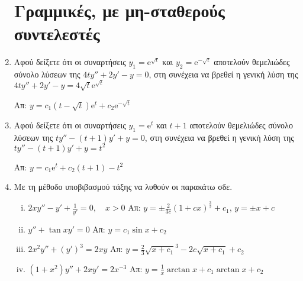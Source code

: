 \begin{enumerate}
  \section*{Γραμμικές, με μη-σταθερούς συντελεστές}

\item Αφού δείξετε ότι οι συναρτήσεις $ y_{1} = \mathrm{e}^{\sqrt{t}} $ και $ y_{2}= 
  \mathrm{e}^{- \sqrt{t}}$ αποτελούν θεμελιώδες σύνολο λύσεων της $ 4ty'' +2y'-y=0 $, 
  στη συνέχεια να βρεθεί η γενική λύση της 
  $ 4ty''+2y'-y=4 \sqrt{t} \mathrm{e}^{\sqrt{t}} $

  \hfill Απ: $ y= c_{1}(t- \sqrt{t}) \mathrm{e}^{t} + c_{2} \mathrm{e}^{- \sqrt{t}} $ 

\item Αφού δείξετε ότι οι συναρτήσεις $ y_{1} = \mathrm{e}^{t} $ και $t+1$ αποτελούν 
  θεμελιώδες σύνολο λύσεων της $ty''-(t+1)y'+y=0$, 
  στη συνέχεια να βρεθεί η γενική λύση της 
  $ ty''-(t+1)y'+y=t^{2}$

  \hfill Απ: $y= c_{1} \mathrm{e}^{t} + c_{2}(t+1) - t^{2} $ 

\item Με τη μέθοδο υποβιβασμού τάξης να λυθούν οι παρακάτω σδε.
  \begin{enumerate}[i)]
    \item $ 2xy'' - y' + \frac{1}{y'} = 0, \quad x > 0 $
      \hfill Απ: $ y= \pm \frac{2}{3c} (1+cx)^{\frac{3}{2}} + c_{1} $, \; 
      $ y= \pm x + c $ 
    \item $ y'' + \tan{x} y' = 0 $ \hfill Απ: $ y= c_{1} \sin{x} + c_{2} $ 
    \item $ 2x^{2}y''+ (y')^{3} = 2xy $ 
      \hfill Απ: $ y= \frac{2}{3} \sqrt{x+c_{1}}^{3} - 
      2c \sqrt{x+c_{1}} + c_{2} $ 
    \item $ (1+x^{2})y'' + 2xy' = 2x^{-3} $ \hfill Απ: $ y= \frac{1}{x} 
      \arctan x + c_{1} \arctan x + c_{2} $ 
  \end{enumerate}


\end{enumerate}
